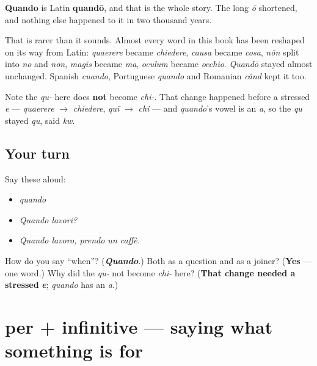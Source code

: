 \begin{cousinweb}
\textbf{Quando} is Latin \textbf{quandō}, and that is the whole story. The long \emph{ō} shortened, and nothing else happened to it in two thousand years.

That is rarer than it sounds. Almost every word in this book has been reshaped on its way from Latin: \emph{quaerere} became \emph{chiedere}, \emph{causa} became \emph{cosa}, \emph{nōn} split into \emph{no} and \emph{non}, \emph{magis} became \emph{ma}, \emph{oculum} became \emph{occhio}. \emph{Quandō} stayed almost unchanged. Spanish \emph{cuando}, Portuguese \emph{quando} and Romanian \emph{când} kept it too.

Note the \emph{qu-} here does \textbf{not} become \emph{chi-}. That change happened before a stressed \emph{e} — \emph{quaerere} $\to$ \emph{chiedere}, \emph{quī} $\to$ \emph{chi} — and \emph{quando}'s vowel is an \emph{a}, so the \emph{qu} stayed \emph{qu}, said \emph{kw}.
\end{cousinweb}

\subsection*{Your turn}
Say these aloud:

\begin{itemize}
\raggedright
  \item \emph{quando}
  \item \emph{Quando lavori?}
  \item \emph{Quando lavoro, prendo un caffè.}
\end{itemize}

\begin{tcolorbox}[breakable,colback=teal!4,colframe=teal!35!black,title={Before you move on}]
How do you say \textquotedblleft{}when\textquotedblright{}? (\emph{\textbf{Quando}}.) Both as a question and as a joiner? (\textbf{Yes} — one word.) Why did the \emph{qu-} not become \emph{chi-} here? (\textbf{That change needed a stressed} \emph{\textbf{e}}; \emph{quando} has an \emph{a}.)
\end{tcolorbox}
\section[per + infinito]{per + infinitive — saying what something is for}

\label{lesson:IT-C32-per}



